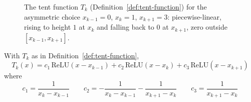 		\begin{figure}[h]
			\centering
			\caption{The tent function $T_k$ (Definition~\ref{def:tent-function}) for the asymmetric choice $x_{k-1}=0$, $x_k=1$, $x_{k+1}=3$: piecewise-linear, rising to height $1$ at $x_k$ and falling back to $0$ at $x_{k+1}$, zero outside $[x_{k-1},x_{k+1}]$.}
			\label{fig:tent-function}
		\end{figure}
		
		\begin{proposition}
			\label{prop:tent-relu}
			With $T_k$ as in Definition~\ref{def:tent-function},
			\[
				T_k(x) = c_1\,\mathrm{ReLU}(x-x_{k-1}) + c_2\,\mathrm{ReLU}(x-x_k) + c_3\,\mathrm{ReLU}(x-x_{k+1})
			\]
			where
			\[
				c_1 = \frac{1}{x_k-x_{k-1}} \qquad c_2 = -\frac{1}{x_k-x_{k-1}} - \frac{1}{x_{k+1}-x_k} \qquad c_3 = \frac{1}{x_{k+1}-x_k}
			\]
		\end{proposition}
		
